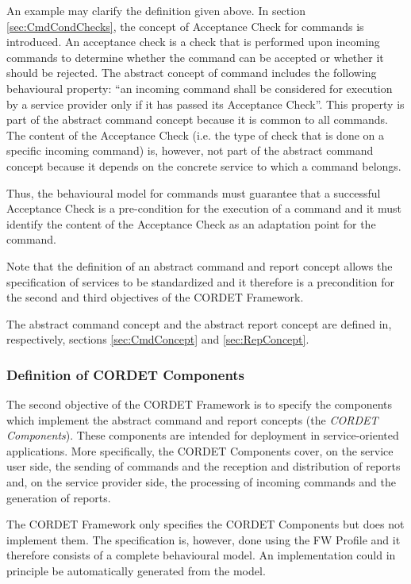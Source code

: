 \documentclass{pnp_article}
\begin{document}
An example may clarify the definition given above. 
In section \ref{sec:CmdCondChecks}, the concept of Acceptance Check for commands is introduced. 
An acceptance check is a check that is performed upon incoming commands to determine whether the command can be accepted or whether it should be rejected. 
The abstract concept of command includes the following behavioural property: “an incoming command shall be considered for execution by a service provider only if it has passed its Acceptance Check”. 
This property is part of the abstract command concept because it is common to all commands. 
The content of the Acceptance Check (i.e. the type of check that is done on a specific incoming command) is, however, not part of the abstract command concept because it depends on the concrete service to which a command belongs.

Thus, the behavioural model for commands must guarantee that a successful Acceptance Check is a pre-condition for the execution of a command and it must identify the content of the Acceptance Check as an adaptation point for the command.

Note that the definition of an abstract command and report concept allows the specification of services to be standardized and it therefore is a precondition for the second and third objectives of the CORDET Framework. 

The abstract command concept and the abstract report concept are defined in, respectively, sections \ref{sec:CmdConcept} and \ref{sec:RepConcept}.

\subsubsection{Definition of CORDET Components}\label{sec:DefCrCmp}
The second objective of the CORDET Framework is to specify the components which implement the abstract command and report concepts (the \textit{CORDET Components}). 
These components are intended for deployment in service-oriented applications. 
More specifically, the CORDET Components cover, on the service user side, the sending of commands and the reception and distribution of reports and, on the service provider side, the processing of incoming commands and the generation of reports.

The CORDET Framework only specifies the CORDET Components but does not implement them. 
The specification is, however, done using the FW Profile and it therefore consists of a complete behavioural model. 
An implementation could in principle be automatically generated from the model. 
\end{document}
